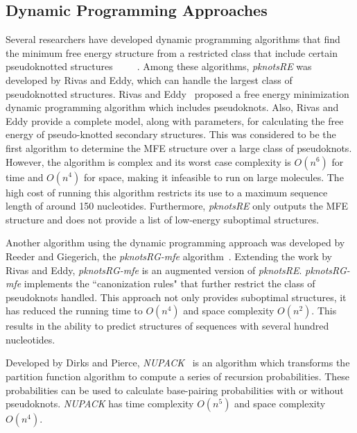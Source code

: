 \documentclass{doublecol-new}
\theoremstyle{TH}{
\newtheorem{lemma}{Lemma}
\newtheorem{theorem}[lemma]{Theorem}
\newtheorem{corrolary}[lemma]{Corrolary}
\newtheorem{conjecture}[lemma]{Conjecture}
\newtheorem{proposition}[lemma]{Proposition}
\newtheorem{claim}[lemma]{Claim}
\newtheorem{stheorem}[lemma]{Wrong Theorem}
\newtheorem{algorithm}{Algorithm}
}
\theoremstyle{THrm}{
\newtheorem{definition}{Definition}
\newtheorem{question}{Question}
\newtheorem{remark}{Remark}
\newtheorem{scheme}{Scheme}
}
\theoremstyle{THhit}{
\newtheorem{case}{Case}[section]
}
\begin{document}
\subsection{Dynamic Programming Approaches}
Several researchers have developed dynamic programming algorithms
that find the minimum free energy structure from a restricted class
that include certain pseudoknotted
structures~\cite{rivas99dynamic}~\cite{uemura_1999}~\cite{akutsu_2000}~\cite{lyngs00pseudoknots}~\cite{dirks_2003}.
Among these algorithms, {\em pknotsRE} was developed by Rivas and Eddy, which can handle
the largest class of pseudoknotted structures.
Rivas and Eddy~\cite{rivas99dynamic}  proposed a free energy minimization dynamic
programming algorithm which includes pseudoknots.
Also, Rivas and Eddy provide a complete model, along with parameters, for calculating the
free energy of pseudo-knotted secondary structures.
This was considered to be the first algorithm to
determine the MFE structure over a large class of pseudoknots. However, the algorithm
is complex and its worst
case complexity is $O(n^6)$ for time and $O(n^4)$ for space,  making it infeasible to
run on large molecules. The high cost of running this algorithm restricts its use to
a maximum sequence length of around 150 nucleotides.
Furthermore,  {\em pknotsRE}
only outputs the MFE structure and does not provide a list of low-energy suboptimal structures.

Another algorithm using the dynamic programming approach was developed
by Reeder and Giegerich,  the {\em pknotsRG-mfe}
algorithm~\cite{reeder_2004}. Extending the work by Rivas and Eddy,
{\em pknotsRG-mfe} is an augmented version of {\em pknotsRE}. 
{\em pknotsRG-mfe}
implements the ``canonization rules" that further restrict the
class of pseudoknots handled.  This approach not only provides
suboptimal structures, it has reduced the running time to $O(n^4)$
and space complexity  $O(n^2)$. This results in the ability to predict
structures of sequences with several hundred nucleotides.

Developed by Dirks and Pierce, {\em NUPACK}~\cite{dirks_2003} is an
algorithm which transforms the partition function algorithm to
compute a series of recursion probabilities. These  probabilities
can be used to calculate base-pairing probabilities with or without
pseudoknots. {\em NUPACK} has time complexity $O(n^5)$ and space
complexity $O(n^4)$.
\end{document}
